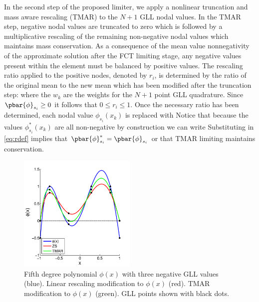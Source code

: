 \documentclass{ametsoc}
\begin{document}
In the second step of the proposed limiter, we apply a nonlinear truncation and mass aware rescaling (TMAR) to the $N+1$ GLL nodal values. In the TMAR step, negative nodal values are truncated to zero which is followed by a multiplicative rescaling of the remaining non-negative nodal values which maintains mass conservation. As a consequence of the mean value nonnegativity of the approximate solution after the FCT limiting stage, any negative values present within the element must be balanced by positive values. The rescaling ratio applied to the positive nodes, denoted by $r_i$, is determined by the ratio of the original mean to the new mean which has been modified after the truncation step:
where the $w_k$ are the weights for the $N+1$ point GLL quadrature. Since $\pbar{\phi}_{s_i} \geq 0$ it follows that $0\leq r_i \leq 1$.  Once the necessary ratio has been determined, each nodal value $\phi_{s_i}(x_k)$ is replaced with
Notice that because the values $\phi_{s_i}^*(x_k)$ are all non-negative by construction we can write
Substituting in \eqref{eq:rdef} implies that $\pbar{\phi}_{s_i}^* =\pbar{\phi}_{s_i}$ or that TMAR limiting maintains conservation. 

\begin{figure}
\includegraphics[width=0.5\textwidth]{figs/1d/zsTMAR_compareEx.pdf}
\caption{Fifth degree polynomial $\phi(x)$ with three negative GLL values (blue). Linear rescaling modification to $\phi(x)$ (red). TMAR modification to $\phi(x)$ (green). GLL points shown with black dots. } \label{fig:polyModCompare}
\end{figure}
\end{document}
